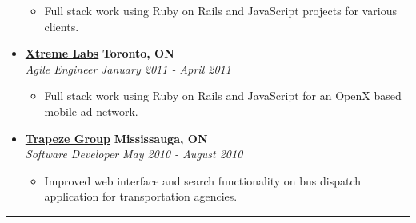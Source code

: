 \documentclass[10pt,letterpaper]{article}
\begin{document}
\begin{itemize}
    \begin{itemize}[label=\textbullet]
      \itemsep0em
      \item Full stack work using Ruby on Rails and JavaScript projects for various
        clients.
    \end{itemize}

    \item[]
    {\href{http://www.xtremelabs.com/}{\textbf{Xtreme Labs}} \hfill
      \textbf{Toronto, ON}}
    \\
    {\emph{Agile Engineer} \hfill \emph{January 2011 - April 2011}}

    \begin{itemize}[label=\textbullet]
      \itemsep0em
      \item Full stack work using Ruby on Rails and JavaScript for an OpenX
        based mobile ad network.
    \end{itemize}

    \item[]
    {\href{http://www.trapezegroup.com/}{\textbf{Trapeze Group}} \hfill
      \textbf{Mississauga, ON}}
    \\
    {\emph{Software Developer} \hfill \emph{May 2010 - August 2010}}

    \begin{itemize}[label=\textbullet]
      \itemsep0em
      \item Improved web interface and search functionality on bus dispatch
        application for transportation agencies.
    \end{itemize}
  \end{itemize}



\hrule
\vspace{-1.0em}
\end{document}
